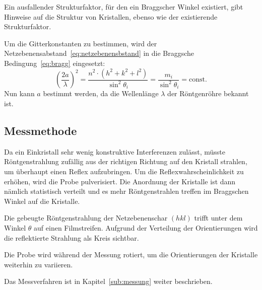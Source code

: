 Ein ausfallender Strukturfaktor, für den ein Braggscher Winkel existiert,
gibt Hinweise auf die Struktur von Kristallen,
ebenso wie der existierende Strukturfaktor.

Um die Gitterkonstanten zu bestimmen,
wird der Netzebenensabstand~\ref{eq:netzebenensbstand}
in die Braggsche Bedingung~\ref{eq:bragg} eingesetzt:
\begin{equation}
  \label{eq:const}
  {\left(\frac{2a}{\lambda}\right)}^2
  = \frac{n^2 \cdot \left(h^2 + k^2 + l^2\right)}{\sin^2\!\theta_i}
  = \frac{m_i}{\sin^2\!\theta_i} = \text{const.}
\end{equation}
Nun kann $a$ bestimmt werden, da die Wellenlänge $\lambda$ der Röntgenröhre bekannt ist.


\subsection{Messmethode}
Da ein Einkristall sehr wenig konstruktive Interferenzen zulässt,
müsste Röntgenstrahlung zufällig aus der richtigen Richtung auf den Kristall
strahlen, um überhaupt einen Reflex aufzubringen.
Um die Reflexwahrscheinlichkeit zu erhöhen, wird die Probe pulverisiert.
Die Anordnung der Kristalle ist dann nämlich statistisch verteilt
und es mehr Röntgenstrahlen treffen im Braggschen Winkel auf die Kristalle.

Die gebeugte Röntgenstrahlung der Netzebenenschar $(hkl)$ trifft unter
dem Winkel $\theta$ auf einen Filmstreifen.
Aufgrund der Verteilung der Orientierungen wird die reflektierte Strahlung
als Kreis sichtbar.

Die Probe wird während der Messung rotiert, um die Orientierungen der Kristalle
weiterhin zu variieren.

Das Messverfahren ist in Kapitel~\ref{sub:messung} weiter beschrieben.

